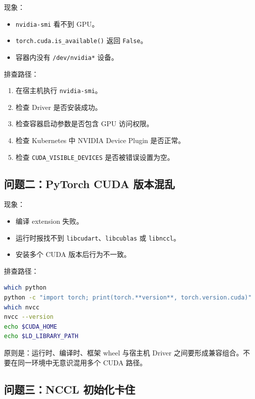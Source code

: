 现象：

\begin{itemize}
\item \texttt{nvidia-smi} 看不到 GPU。
\item \texttt{torch.cuda.is_available()} 返回 \texttt{False}。
\item 容器内没有 \texttt{/dev/nvidia*} 设备。
\end{itemize}

排查路径：

\begin{enumerate}
\item 在宿主机执行 \texttt{nvidia-smi}。
\item 检查 Driver 是否安装成功。
\item 检查容器启动参数是否包含 GPU 访问权限。
\item 检查 Kubernetes 中 NVIDIA Device Plugin 是否正常。
\item 检查 \texttt{CUDA_VISIBLE_DEVICES} 是否被错误设置为空。
\end{enumerate}

\subsection{问题二：PyTorch CUDA 版本混乱}

现象：

\begin{itemize}
\item 编译 extension 失败。
\item 运行时报找不到 \texttt{libcudart}、\texttt{libcublas} 或 \texttt{libnccl}。
\item 安装多个 CUDA 版本后行为不一致。
\end{itemize}

排查路径：

\begin{lstlisting}[language=bash,caption={检查 CUDA 相关路径},label={lst:check-cuda-paths}]
which python
python -c "import torch; print(torch.**version**, torch.version.cuda)"
which nvcc
nvcc --version
echo $CUDA_HOME
echo $LD_LIBRARY_PATH
\end{lstlisting}

原则是：运行时、编译时、框架 wheel 与宿主机 Driver 之间要形成兼容组合。不要在同一环境中无意识混用多个 CUDA 路径。

\subsection{问题三：NCCL 初始化卡住}

